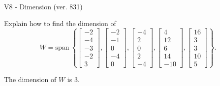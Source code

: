 \begin{exercise}
  \begin{exerciseTitle}V8 - Dimension (ver. 831)\end{exerciseTitle}
  \begin{exerciseStatement}
    Explain how to find the dimension of 
\[W=\mathrm{span}\ \left\{\left[\begin{array}{r}
-2 \\
-4 \\
-3 \\
-2 \\
3
\end{array}\right] , \left[\begin{array}{r}
-2 \\
-1 \\
0 \\
-4 \\
0
\end{array}\right] , \left[\begin{array}{r}
-4 \\
2 \\
0 \\
2 \\
-4
\end{array}\right] , \left[\begin{array}{r}
4 \\
12 \\
6 \\
14 \\
-10
\end{array}\right] , \left[\begin{array}{r}
16 \\
3 \\
3 \\
10 \\
5
\end{array}\right]\right\}.\]



  \end{exerciseStatement}
  \begin{exerciseAnswer}
   The dimension of \(W\) is  \(3\).
  


  \end{exerciseAnswer}
\end{exercise}